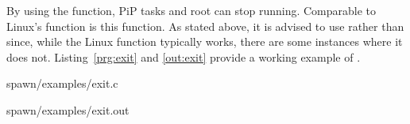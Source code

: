 By using the  function, PiP tasks and root can stop
running. Comparable to Linux's  function is this function. As
stated above, it is advised to use  rather than
 since, while the Linux  function
typically works, there are some instances where it does
not. Listing~\ref{prg:exit} and \ref{out:exit} provide a working 
example of .

 {spawn/examples/exit.c}

 {spawn/examples/exit.out}
